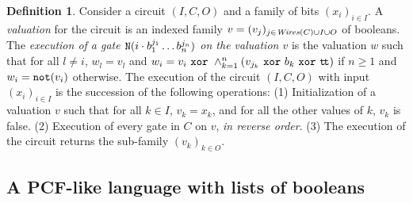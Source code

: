 \documentclass{article}
\theoremstyle{plain}
\theoremstyle{definition}
\newtheorem{definition}[theorem]{Definition}
\newcommand{\cnotgate}[2]{{\tt N}({#1}\cdot{#2})}
\newcommand{\wires}[1]{{\it Wires}({#1})}
\newcommand{\define}[1]{{\em #1}}
\newcommand{\ttrue}{\mathtt{t\!t}}
\begin{document}
\begin{definition}\label{def:exec-circ}
  Consider a circuit $(I,C,O)$ and a family of bits $(x_i)_{i\in I}$.
A \define{valuation} for the circuit is an indexed family
  $v=(v_j)_{j\in\wires{C}\cup I\cup O}$ of booleans.
The \define{execution of a gate $\cnotgate{i}{b_1^{j_1}\ldots b_n^{j_n}}$
    on the valuation $v$} is the valuation $w$ such that for all
  $l\neq i$, $w_l=v_l$ and
  $
  w_i = v_i~{\tt xor}~\wedge_{k=1}^n(v_{j_k}~{\tt xor}~b_k~{\tt xor}~\ttrue)
  $
  if $n\geq 1$ and $w_i = {\tt not}(v_i)$ otherwise.
  The execution of the circuit $(I,C,O)$ with input $(x_i)_{i\in I}$ is
  the succession of the following operations:
  (1) Initialization of a valuation $v$ such that for all $k\in I$,
    $v_k=x_k$, and for all the other values of $k$, $v_k$ is false.
  (2) Execution of every gate in $C$ on $v$, {\em in reverse order}.
  (3) The execution of the circuit returns the sub-family
    $(v_k)_{k\in O}$.
\end{definition}


\subsection{A PCF-like language with lists of booleans}
\end{document}
